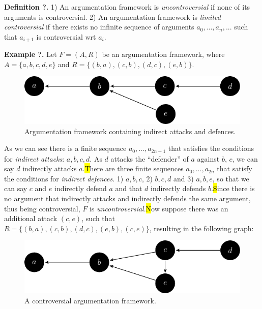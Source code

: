 \textbf{Definition ?.} 1) An argumentation framework is \emph{uncontroversial} if none of its arguments is controversial. 2) An argumentation framework is \emph{limited controversial} if there exists no infinite sequence of arguments $a_0,...,a_n,...$ such that $a_{i+1}$ is controversial wrt $a_i$.\cl

\textbf{Example ?.} Let $F=(A,R)$ be an argumentation framework, where $A=\{a,b,c,d,e\}$ and $R=\{(b,a),(c,b),(d,c),(e,b)\}$.\hl

\FloatBarrier
\begin{figure}[!h]
	\centering
	\includegraphics[width=\linewidth]{graphs/ind.pdf}
	\caption[Indirect attacks and defences]{Argumentation framework containing indirect attacks and defences.}
\end{figure}
\FloatBarrier

As we can see there is a finite sequence $a_0,...,a_{2n+1}$ that satisfies the conditions for \emph{indirect attacks}: $a,b,c,d$. As $d$ attacks the ``defender'' of $a$ against $b$, $c$, we can say $d$ indirectly attacks $a$.\hl
There are three finite sequences $a_0,...,a_{2n}$ that satisfy the conditions for \emph{indirect defences}. 1) $a,b,c$, 2) $b,c,d$ and 3) $a,b,e$, so that we can say $c$ and $e$ indirectly defend $a$ and that $d$ indirectly defends $b$.\hl
Since there is no argument that indirectly attacks and indirectly defends the same argument, thus being controversial, $F$ is \emph{uncontroversial}.\hl
Now suppose there was an additional attack $(c,e)$, such that $R=\{(b,a),(c,b),(d,c),(e,b),(c,e)\}$, resulting in the following graph:\hl

\FloatBarrier
\begin{figure}[!h]
	\centering
	\includegraphics[width=\linewidth]{graphs/cont.pdf}
	\caption{A controversial argumentation framework.}
\end{figure}
\FloatBarrier

